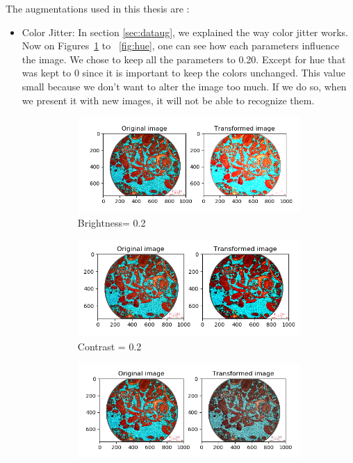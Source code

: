 The augmentations used in this thesis are :
\begin{itemize}
    \item Color Jitter: In section \ref{sec:dataug}, we explained the way color jitter works. Now on Figures~\ref{fig:brightness} to ~\ref{fig:hue}, one can see how each parameters influence the image.
    We chose to keep all the parameters to 0.20. Except for hue that was kept to 0 since it is important to keep the colors unchanged. This value small because we don't want to alter the image too much. If we do so, when we present it with new images, it will not be able to recognize them. 

\begin{figure}
\begin{subfigure}{.5\textwidth}
  \centering
  \includegraphics[width=.8\linewidth]{figures/03-bightness08.PNG}
  \caption{Brightness= 0.2}
  \label{fig:brightness}
\end{subfigure}%
\begin{subfigure}{.5\textwidth}
  \centering
  \includegraphics[width=.8\linewidth]{figures/03-contrast1.PNG}
  \caption{Contrast = 0.2}
  \label{fig:contrast}
\end{subfigure}
\begin{subfigure}{.5\textwidth}
  \centering
  \includegraphics[width=.8\linewidth]{figures/03-saturation0.PNG}

\end{subfigure}
\end{figure}
\end{itemize}
